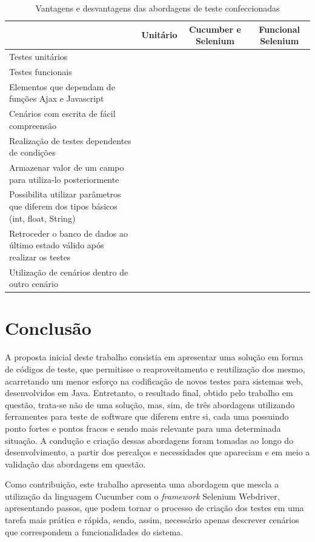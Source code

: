 \documentclass[tg]{mdtufsm}
\begin{document}
\begin{table}[!htpb]
	\centering
	\begin{tabular}{p{5cm}|c|c|c}
		& Unitário & Cucumber e Selenium & Funcional Selenium\\ \hline
		Testes unitários & \checkmark & \checkmark & \checkmark \\ \hline
		Testes funcionais &  & \checkmark & \checkmark \\ \hline
		Elementos que dependam de funções Ajax e Javascript & & \checkmark & \checkmark \\ \hline
		Cenários com escrita de fácil compreensão & & \checkmark & \\ \hline
		Realização de testes dependentes de condições & & & \checkmark \\ \hline
		Armazenar valor de um campo para utiliza-lo posteriormente & & & \checkmark \\ \hline
		Possibilita utilizar parâmetros que diferem dos tipos básicos (int, float, String) & \checkmark & & \checkmark \\ \hline
		Retroceder o banco de dados ao último estado válido após realizar os testes & & & \\ \hline
		Utilização de cenários dentro de outro cenário & & & \checkmark \\ \hline
	\end{tabular}
	\caption{Vantagens e desvantagens das abordagens de teste confeccionadas}
	\label{tab:comparacaoSolucoes}
\end{table}

\chapter{Conclusão}
A proposta inicial deste trabalho consistia em apresentar uma solução em forma de códigos de teste, que permitisse o reaproveitamento e reutilização dos mesmo, acarretando um menor esforço na codificação de novos testes para sistemas web, desenvolvidos em Java. Entretanto, o resultado final, obtido pelo trabalho em questão, trata-se não de uma solução, mas, sim, de três abordagens utilizando ferramentes para teste de software que diferem entre si, cada uma possuindo ponto fortes e pontos fracos e sendo mais relevante para uma determinada situação. A condução e criação dessas abordagens foram tomadas ao longo do desenvolvimento, a partir dos percalços e necessidades que apareciam e em meio a validação das abordagens em questão.

Como contribuição, este trabalho apresenta uma abordagem que mescla a utilização da linguagem Cucumber com o \emph{framework} Selenium Webdriver, apresentando passos, que podem tornar o processo de criação dos testes em uma tarefa mais prática e rápida, sendo, assim, necessário apenas descrever cenários que correspondem a funcionalidades do sistema.
\end{document}
